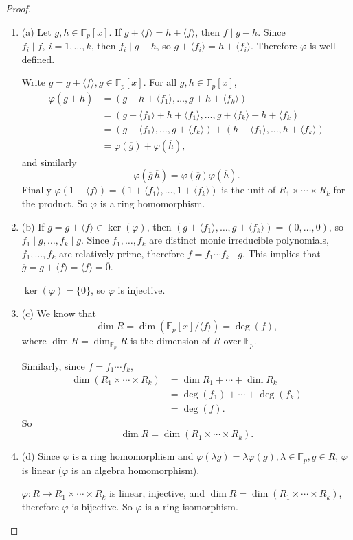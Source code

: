 \documentclass[11pt,a4paper]{article}
\newcommand{\be} {\begin{enumerate}}
\newcommand{\ee} {\end{enumerate}}
\newcommand{\F}{\mathbb{F}}
\begin{document}
\begin{proof}
\be
\item[(a)] Let $g,h \in \F_p[x]$. If $g+ \langle f \rangle = h + \langle f \rangle$, then $f \mid g-h$. Since $f_i \mid f, \ i=1,\ldots,k$, then $f_i \mid g-h$, so $g + \langle f_i \rangle = h + \langle f_i \rangle$. Therefore $\varphi$ is well-defined. 

Write $\overline{g} = g+ \langle f \rangle, g \in \F_p[x]$. For all $g,h \in \F_p[x]$, 
\begin{align*}
\varphi(\overline{g} +\overline{h}) &= (g+ h +\langle f_1 \rangle, \ldots, g + h + \langle f_k \rangle)\\
&=(g+ \langle f_1 \rangle + h + \langle f_1 \rangle,\ldots, g+ \langle f_k \rangle + h + \langle f_k)\\
&=(g+ \langle f_1 \rangle, \ldots, g + \langle f_k \rangle) + (h+ \langle f_1 \rangle, \ldots, h+ \langle f_k \rangle)\\
&= \varphi(\overline{g}) + \varphi(\overline{h}),
\end{align*}
and similarly
$$\varphi(\overline{g} \, \overline{h}) = \varphi(\overline{g})  \varphi(\overline{h}).$$
Finally $\varphi(1 + \langle f \rangle) = (1 +\langle f_1 \rangle, \ldots, 1+ \langle f_k \rangle)$ is the unit of  $R_1\times \cdots \times R_k$ for the product.
So $\varphi$ is a ring homomorphism.

\item[(b)] If $\overline{g} = g + \langle f \rangle \in \ker(\varphi)$, then $(g+ \langle f_1 \rangle, \ldots, g + \langle f_k \rangle) = (0,\ldots,0)$, so $f_1 \mid g, \ldots, f_k \mid g$. Since $f_1,\ldots,f_k$ are distinct monic irreducible polynomials, $f_1,\ldots,f_k$ are relatively prime, therefore $f = f_1\cdots f_k \mid g$. This implies that $\overline{g} = g + \langle f \rangle = \langle f \rangle =\overline{0}$.

$\ker(\varphi) = \{\overline{0}\}$, so $\varphi$ is injective.

\item[(c)] We know that $$\dim R = \dim (\F_p[x]/ \langle f \rangle) = \deg(f),$$ where $\dim R = \dim_{\F_p} R$ is the dimension of $R$ over $\F_p$.

Similarly, since $f =f_1 \cdots f_k$,
\begin{align*}
\dim (R_1\times \cdots \times R_k) &= \dim R_1 + \cdots + \dim R_k\\
&= \deg(f_1) + \cdots + \deg(f_k)\\
&= \deg(f).
\end{align*}
So $$ \dim R  = \dim  (R_1\times \cdots \times R_k).$$

\item[(d)]Since $\varphi$ is a ring homomorphism and $\varphi(\lambda \overline{g}) = \lambda \varphi (\overline{g}), \lambda \in \F_p, \overline{g} \in R$, $\varphi$ is linear ($\varphi$ is an algebra homomorphism).

$\varphi : R  \to  R_1\times \cdots \times R_k$ is linear, injective, and $ \dim R  = \dim  (R_1\times \cdots \times R_k)$, therefore $\varphi$ is bijective. So $\varphi$ is a ring isomorphism.
\ee
\end{proof}
\end{document}
